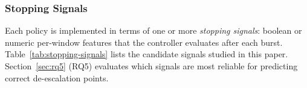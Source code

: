 
\subsubsection{Stopping Signals}

Each policy is implemented in terms of one or more \emph{stopping signals}: boolean or numeric per-window features that the controller evaluates after each burst. Table~\ref{tab:stopping-signals} lists the candidate signals studied in this paper. Section~\ref{sec:rq5} (RQ5) evaluates which signals are most reliable for predicting correct de-escalation points.

